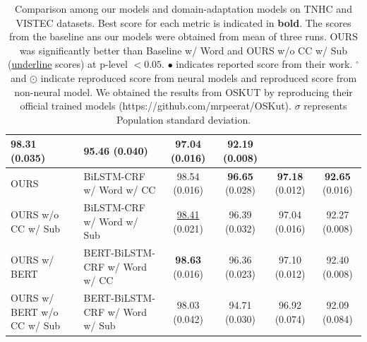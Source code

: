 \begin{table}
{\begin{tabular}{llcccc}
  98.31 (0.035) &
  95.46 (0.040) &
  97.04 (0.016) &
  92.19 (0.008) \\ \hline
OURS &
  BiLSTM-CRF w/ Word w/ CC &
  98.54 (0.016) &
  \textbf{96.65} (0.028) &
  \textbf{97.18} (0.012) &
  \textbf{92.65} (0.016) \\
OURS w/o CC w/ Sub &
  BiLSTM-CRF w/ Word w/ Sub &
  \underline{98.41} (0.021) &
  96.39 (0.032) &
  97.04 (0.016) &
  92.27 (0.008) \\ \hdashline
OURS w/ BERT &
  BERT-BiLSTM-CRF w/ Word w/ CC &
  \textbf{98.63} (0.016) &
  96.36 (0.023) &
  97.10 (0.012) &
  92.40 (0.008) \\
OURS w/ BERT w/o CC w/ Sub &
  BERT-BiLSTM-CRF w/ Word w/ Sub &
  98.03 (0.042) &
  94.71 (0.030) &
  96.92 (0.074) &
  92.09 (0.084) \\ \hline
\end{tabular}}
\caption{Comparison among our models and domain-adaptation models on TNHC and VISTEC datasets. Best score for each metric is indicated in \textbf{bold}. The scores from the baseline ans our models were obtained from mean of three runs. OURS was significantly better than Baseline w/ Word and OURS w/o CC w/ Sub (\underline{underline} scores) at p-level $< 0.05$. $\bullet$ indicates reported score from their work. $^\circ$ and $\odot$ indicate reproduced score from neural models and reproduced score from non-neural model. We obtained the results from OSKUT by reproducing their official trained models (https://github.com/mrpeerat/OSKut). $\sigma$ represents Population standard deviation.}
\label{tab:domain-adapt-results}
\end{table}

